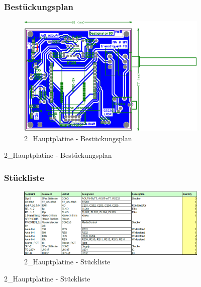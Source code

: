 \begin{figure}
	\subsubsection*{Bestückungsplan}
	\begin{figure} [H]
		\centering
		\includegraphics[width=1\textwidth]{img/BTModul/hauptboard_Best.png}
		\caption{2\_Hauptplatine - Bestückungsplan}
		\label {fig:8.10.8}
	\end{figure}
\end{figure}

\begin{figure}
	\subsubsection*{Stückliste}
	\begin{figure} [H]
		\centering
		\includegraphics[width=1\textwidth]{img/BTModul/hauptboard_Blist.png}
		\caption{2\_Hauptplatine - Stückliste}
		\label {fig:8.10.9}
	\end{figure}
\end{figure}







